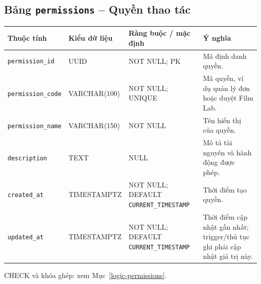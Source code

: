 \subsection{Bảng \texttt{permissions} -- Quyền thao tác}
\label{dictionary-permissions}
\begingroup
\footnotesize
\setlength{\tabcolsep}{3pt}
\begin{longtable}{>{\raggedright\arraybackslash}p{3.1cm}>{\raggedright\arraybackslash}p{2.5cm}>{\raggedright\arraybackslash}p{3.7cm}>{\raggedright\arraybackslash}p{4.3cm}}
\toprule
Thuộc tính & Kiểu dữ liệu & Ràng buộc / mặc định & Ý nghĩa \\
\midrule
\endhead
\texttt{permission\_\allowbreak{}id} & UUID & NOT NULL; PK & Mã định danh quyền. \\
\texttt{permission\_\allowbreak{}code} & VARCHAR(100) & NOT NULL; UNIQUE & Mã quyền, ví dụ quản lý đơn hoặc duyệt Film Lab. \\
\texttt{permission\_\allowbreak{}name} & VARCHAR(150) & NOT NULL & Tên hiển thị của quyền. \\
\texttt{description} & TEXT & NULL & Mô tả tài nguyên và hành động được phép. \\
\texttt{created\_\allowbreak{}at} & TIMESTAMPTZ & NOT NULL; DEFAULT \texttt{CURRENT\_\allowbreak{}TIMESTAMP} & Thời điểm tạo quyền. \\
\texttt{updated\_\allowbreak{}at} & TIMESTAMPTZ & NOT NULL; DEFAULT \texttt{CURRENT\_\allowbreak{}TIMESTAMP} & Thời điểm cập nhật gần nhất; trigger/thủ tục ghi phải cập nhật giá trị này. \\
\bottomrule
\end{longtable}
\endgroup
CHECK và khóa ghép: xem Mục~\ref{logic-permissions}.
